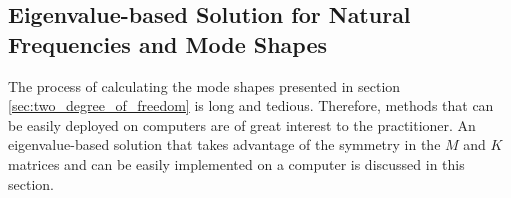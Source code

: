 \documentclass[12pt,letter]{article}
\begin{document}
\begin{vibration_case_study}
\end{vibration_case_study}



\subsection{Eigenvalue-based Solution for Natural Frequencies and Mode Shapes}

The process of calculating the mode shapes presented in section \ref{sec:two_degree_of_freedom} is long and tedious. Therefore, methods that can be easily deployed on computers are of great interest to the practitioner. An eigenvalue-based solution that takes advantage of the symmetry in the $M$ and $K$ matrices and can be easily implemented on a computer is discussed in this section. 
\end{document}
